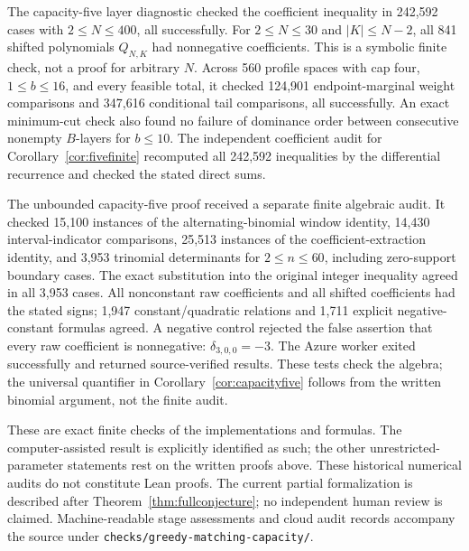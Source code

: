 \documentclass[11pt]{article}
\begin{document}
The capacity-five layer diagnostic checked the coefficient inequality
in 242,592 cases with $2\leq N\leq400$, all successfully.
For $2\leq N\leq30$ and $|K|\leq N-2$, all 841 shifted
polynomials $Q_{N,K}$ had nonnegative coefficients. This is a
symbolic finite check, not a proof for arbitrary $N$.
Across 560 profile spaces with cap four, $1\leq b\leq16$, and
every feasible total, it checked 124,901 endpoint-marginal weight
comparisons and 347,616 conditional tail comparisons, all successfully.
An exact minimum-cut check also found no failure of dominance order
between consecutive nonempty $B$-layers for $b\leq10$.
The independent coefficient audit for
Corollary~\ref{cor:fivefinite} recomputed all 242,592 inequalities
by the differential recurrence and checked the stated direct sums.

The unbounded capacity-five proof received a separate finite algebraic
audit. It checked 15,100 instances of the alternating-binomial window
identity, 14,430 interval-indicator comparisons, 25,513 instances of the
coefficient-extraction identity, and 3,953 trinomial determinants for
$2\leq n\leq60$, including zero-support boundary cases. The exact
substitution into the original integer inequality agreed in all 3,953
cases. All nonconstant raw coefficients and all shifted coefficients
had the stated signs; 1,947 constant/quadratic relations and 1,711
explicit negative-constant formulas agreed. A negative control rejected
the false assertion that every raw coefficient is nonnegative:
$\delta_{3,0,0}=-3$. The Azure worker exited successfully and returned
source-verified results. These tests check the algebra; the universal
quantifier in Corollary~\ref{cor:capacityfive} follows from the written
binomial argument, not the finite audit.

These are exact finite checks of the implementations and formulas.
The computer-assisted result is explicitly identified as such;
the other unrestricted-parameter statements rest on the written proofs above.
These historical numerical audits do not constitute Lean proofs.
The current partial formalization is described after
Theorem~\ref{thm:fullconjecture}; no independent human review is claimed.
Machine-readable stage assessments and cloud audit records accompany
the source under \texttt{checks/greedy-matching-capacity/}.
\end{document}
